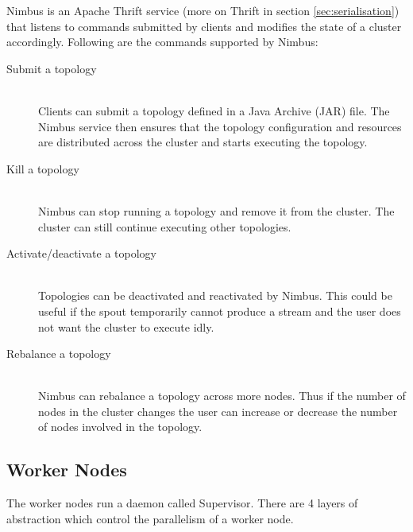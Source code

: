 Nimbus is an Apache Thrift \cite{ApacheThrift} service (more on Thrift in section \ref{sec:serialisation}) that listens to commands submitted by clients and modifies the state of a cluster accordingly. Following are the commands supported by Nimbus:

\begin{description}
	\item[Submit a topology] \hfill \\
	Clients can submit a topology defined in a Java Archive (JAR) file. The Nimbus service then ensures that the topology configuration and resources are distributed across the cluster and starts executing the topology.
	\item[Kill a topology] \hfill \\
	Nimbus can stop running a topology and remove it from the cluster. The cluster can still continue executing other topologies.
	\item[Activate/deactivate a topology] \hfill \\
	Topologies can be deactivated and reactivated by Nimbus. This could be useful if the spout temporarily cannot produce a stream and the user does not want the cluster to execute idly.
	\item[Rebalance a topology] \hfill \\
	Nimbus can rebalance a topology across more nodes. Thus if the number of nodes in the cluster changes the user can increase or decrease the number of nodes involved in the topology.
\end{description}


\subsection{Worker Nodes}

The worker nodes run a daemon called Supervisor. There are 4 layers of abstraction which control the parallelism of a worker node.

